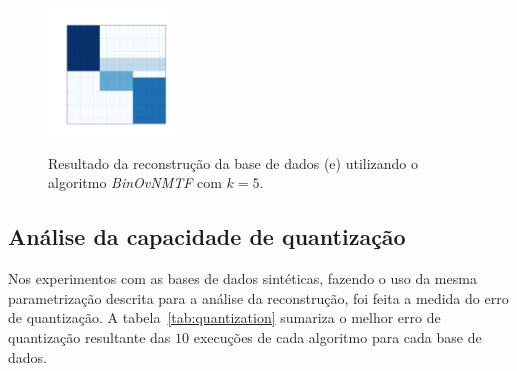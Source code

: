 \documentclass[
    12pt,                %
    oneside,            %
    a4paper,            %
    english,            %
    brazil                %
    ]{abntex2ppgsi}
\begin{document}
\begin{figure}[H]
\centering
    \caption{Resultado da reconstrução da base de dados (e) utilizando o algoritmo \textit{Bin\-OvNMTF} com $k = 5$.}
    \includegraphics[width=0.3\textwidth]{img/e-reconstruction-2-binovnmtf.png}
    \label{fig:reconstruction-2:binovnmtf}
\end{figure}

\subsection{Análise da capacidade de quantização}

Nos experimentos com as bases de dados sintéticas, fazendo o uso da mesma parametrização descrita para a análise da reconstrução, foi feita a medida do erro de quantização. A tabela~\ref{tab:quantization} sumariza o melhor erro de quantização resultante das $10$ execuções de cada algoritmo para cada base de dados.

\end{document}
